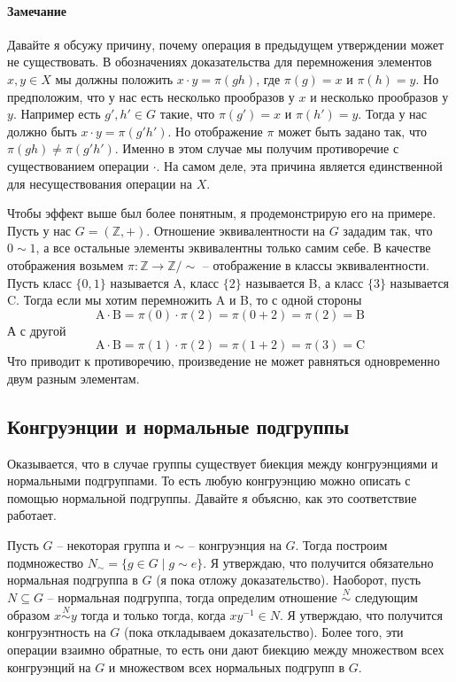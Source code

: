 \paragraph{Замечание}

Давайте я обсужу причину, почему операция в предыдущем утверждении может не существовать.
В обозначениях доказательства для перемножения элементов $x,y\in X$ мы должны положить $x\cdot y = \pi(gh)$, где $\pi(g) = x$ и $\pi(h) = y$.
Но предположим, что у нас есть несколько прообразов у $x$ и несколько прообразов у $y$.
Например есть $g',h'\in G$ такие, что $\pi(g') = x$ и $\pi(h') = y$.
Тогда у нас должно быть $x\cdot y = \pi(g'h')$.
Но отображение $\pi$ может быть задано так, что $\pi(gh) \neq \pi(g'h')$.
Именно в этом случае мы получим противоречие с существованием операции $\cdot$.
На самом деле, эта причина является единственной для несуществования операции на $X$.

Чтобы эффект выше был более понятным, я продемонстрирую его на примере.
Пусть у нас $G = (\mathbb Z, +)$.
Отношение эквивалентности на $G$ зададим так, что $0 \sim 1$, а все остальные элементы эквивалентны только самим себе.
В качестве отображения возьмем $\pi \colon \mathbb Z\to \mathbb Z/{\sim}$ -- отображение в классы эквивалентности.
Пусть класс $\{0, 1\}$ называется A, класс $\{2\}$ называется B, а класс $\{3\}$ называется C.
Тогда если мы хотим перемножить A и B, то с одной стороны
\[
\text{A}\cdot \text{B} = \pi(0) \cdot \pi(2) = \pi(0+2) = \pi(2) = \text{B}
\]
А с другой
\[
\text{A}\cdot \text{B} = \pi(1) \cdot \pi(2) = \pi(1+2) = \pi(3) = \text{C}
\]
Что приводит к противоречию, произведение не может равняться одновременно двум разным элементам.


\subsection{Конгруэнции и нормальные подгруппы}

Оказывается, что в случае группы существует биекция между конгруэнциями и нормальными подгруппами.
То есть любую конгруэнцию можно описать с помощью нормальной подгруппы.
Давайте я объясню, как это соответствие работает.

Пусть $G$ -- некоторая группа и $\sim$ -- конгруэнция на $G$.
Тогда построим подмножество $N_\sim = \{g\in G \mid g \sim e\}$.
Я утверждаю, что получится обязательно нормальная подгруппа в $G$ (я пока отложу доказательство).
Наоборот, пусть $N\subseteq G$ -- нормальная подгруппа, тогда определим отношение $\stackrel{N}{\sim}$ следующим образом $x \stackrel{N}{\sim}y$ тогда и только тогда, когда $xy^{-1}\in N$.
Я утверждаю, что получится конгруэнтность на $G$ (пока откладываем доказательство).
Более того, эти операции взаимно обратные, то есть они дают биекцию между множеством всех конгруэнций на $G$ и множеством всех нормальных подгрупп в $G$.

